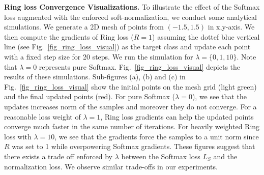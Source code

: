 \documentclass[10pt,twocolumn,letterpaper]{article}
\begin{document}
\textbf{Ring loss Convergence Visualizations.} To illustrate the effect of the Softmax loss augmented with the enforced soft-normalization, we conduct some analytical simulations. We generate a 2D mesh of points from $( -1.5, 1.5 )$ in x,y-axis. We then compute the gradients of Ring loss ($R=1$) assuming the dottef blue vertical line (see Fig.~\ref{fig_ring_loss_visual}) as the target class and update each point with a fixed step size for 20 steps. We run the simulation for $\lambda = \{ 0, 1, 10 \}$. Note that $\lambda=0$ represents pure Softmax. Fig.~\ref{fig_ring_loss_visual} depicts the results of these simulations.  Sub-figures (a), (b) and (c)  in Fig.~\ref{fig_ring_loss_visual} show the initial points on the mesh grid (light green) and the final updated points (red). For pure Softmax ($\lambda=0$), we see that the updates increases norm of the samples and moreover they do not converge. For a reasonable loss weight of $\lambda=1$, Ring loss gradients can help the updated points converge much faster in the same number of iterations. For heavily weighted Ring loss with $\lambda=10$, we see that the gradients force the samples to a unit norm since $R$ was set to 1 while overpowering Softmax gradients. These figures suggest that there exists a trade off enforced by $\lambda$ between the Softmax loss $L_S$ and the normalization loss. We observe similar trade-offs in our experiments.\\
\end{document}

